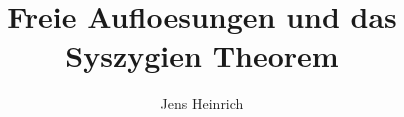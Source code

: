 \usepackage[left=3cm,right=3cm]{geometry}
\usepackage[T1]{fontenc}
\usepackage{lmodern}
\usepackage{standalone}






\usepackage[ngerman]{babel}
\renewcommand{\id}{\ensuremath{Id}}
\renewcommand{\familydefault}{\rmdefault}

\title{Freie Aufloesungen und das Syszygien Theorem}
\author{Jens Heinrich}



